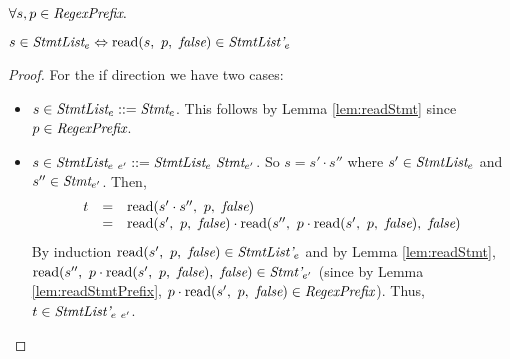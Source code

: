 \documentclass[onecolumn]{sigplanconf-onecolumn}
\begin{document}
\begin{lemma}\mbox{}

  \( \forall s, p \in \textit{RegexPrefix}. \)

  \( s \in \textit{StmtList}_{e} \Leftrightarrow 
  \textrm{read}(s,~p,~\textit{false}) \in \textit{StmtList'}_{e} \)
\end{lemma}
\begin{proof}
  For the if direction we have two cases:
  \begin{itemize}
  \item \( s \in \textit{StmtList}_{e} ::= \textit{Stmt}_{e} \).
    This follows by Lemma \ref{lem:readStmt} since \( p \in \textit{RegexPrefix} \).

  \item \( s \in \textit{StmtList}_{e~e'} ::=
    \textit{StmtList}_{e}~ \textit{Stmt}_{e'} \). So 
    \( s = s' \cdot s'' \) where \( s' \in \textit{StmtList}_{e} \)
    and \( s'' \in \textit{Stmt}_{e'} \). Then,
    \[
    \begin{array}{rcl}
      t &=& \textrm{read}(s' \cdot s'',~p,~\textit{false})
      \\
      &=& \textrm{read}(s',~p,~\textit{false}) \cdot \textrm{read}(s'',~p 
        \cdot \textrm{read}(s',~p,~\textit{false}),~\textit{false})
    \end{array}
    \]
    By induction \( \textrm{read}(s',~p,~\textit{false}) \in \textit{StmtList'}_{e} \)
    and by Lemma \ref{lem:readStmt}, \( \textrm{read}(s'',~p \cdot
      \textrm{read}(s',~p,~\textit{false}),~\textit{false}) \in \textit{Stmt'}_{e'} \) (since
    by Lemma \ref{lem:readStmtPrefix}, \( p \cdot
    \textrm{read}(s',~p,~\textit{false}) \in \textit{RegexPrefix} \)). Thus, \( t \in
    \textit{StmtList'}_{e~e'} \).
  \end{itemize}
\end{proof}
\end{document}
